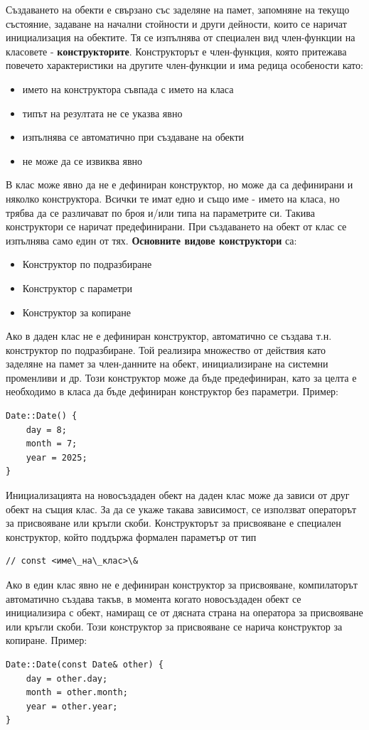 \documentclass{article}
\begin{document}
Създаването на обекти е свързано със заделяне на памет, запомняне на текущо състояние, задаване на начални стойности и други
дейности, които се наричат инициализация на обектите. Тя се изпълнява от специален вид член-функции на класовете -
\textbf{конструкторите}. Конструкторът е член-функция, която притежава повечето характеристики на другите член-функции и има
редица особености като:
\begin{itemize}
    \item името на конструктора съвпада с името на класа
    \item типът на резултата не се указва явно
    \item изпълнява се автоматично при създаване на обекти
    \item не може да се извиква явно
\end{itemize}
В клас може явно да не е дефиниран конструктор, но може да са дефинирани и няколко конструктора. Всички те имат едно и също име - 
името на класа, но трябва да се различават по броя и/или типа на параметрите си. Такива конструктори се наричат предефинирани.
При създаването на обект от клас се изпълнява само един от тях. \textbf{Основните видове конструктори} са:
\begin{itemize}
    \item Конструктор по подразбиране
    \item Конструктор с параметри
    \item Конструктор за копиране
\end{itemize}
Ако в даден клас не е дефиниран конструктор, автоматично се създава т.н. конструктор по подразбиране. Той реализира множество от
действия като заделяне на памет за член-данните на обект, инициализиране на системни променливи и др. Този конструктор може да
бъде предефиниран, като за целта е необходимо в класа да бъде дефиниран конструктор без параметри. \newline\newline
Пример: \begin{lstlisting}[style=cpp]
Date::Date() {
    day = 8;
    month = 7;
    year = 2025;
}
\end{lstlisting}
Инициализацията на новосъздаден обект на даден клас може да зависи от друг обект на същия клас. За да се укаже такава зависимост,
се използват операторът за присвояване или кръгли скоби. Конструкторът за присвояване е специален конструктор, който поддържа
формален параметър от тип
\begin{lstlisting}[style=cpp]
// const <име\_на\_клас>\&
\end{lstlisting}
Ако в един клас явно не е дефиниран конструктор за присвояване, компилаторът автоматично създава такъв, в момента когато новосъздаден обект се
инициализира с обект, намиращ се от дясната страна на оператора за присвояване или кръгли скоби. Този конструктор за присвояване се нарича конструктор
за копиране. \newline\newline
Пример: \begin{lstlisting}[style=cpp]
Date::Date(const Date& other) {
    day = other.day;
    month = other.month;
    year = other.year;
}
\end{lstlisting}
\end{document}
